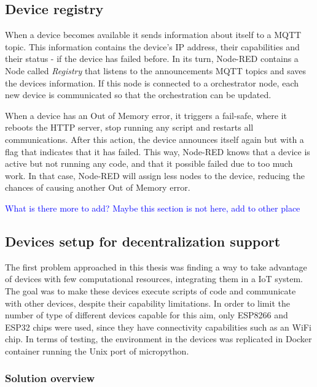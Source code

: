 \subsection{Device registry}\label{sec:registry}

When a device becomes available it sends information about itself to a MQTT topic. This information contains the device's IP address, their capabilities and their status - if the device has failed before. In its turn, Node-RED contains a Node called \textit{Registry} that listens to the announcements MQTT topics and saves the devices information. If this node is connected to a orchestrator node, each new device is communicated so that the orchestration can be updated.

When a device has an Out of Memory error, it triggers a fail-safe, where it reboots the HTTP server, stop running any script and restarts all communications. After this action, the device announces itself again but with a flag that indicates that it has failed. This way, Node-RED knows that a device is active but not running any code, and that it possible failed due to too much work. In that case, Node-RED will assign less nodes to the device, reducing the chances of causing another Out of Memory error.

\textcolor{blue}{What is there more to add? Maybe this section is not here, add to other place}

\subsection{Devices setup for decentralization support}\label{sec:devices_decentralization}

The first problem approached in this thesis was finding a way to take advantage of devices with few computational resources, integrating them in a IoT system. The goal was to make these devices execute scripts of code and communicate with other devices, despite their capability limitations. In order to limit the number of type of different devices capable for this aim, only ESP8266 and ESP32 chips were used, since they have connectivity capabilities such as an WiFi chip. In terms of testing, the environment in the devices was replicated in Docker container running the Unix port of micropython.

\subsubsection{Solution overview}

